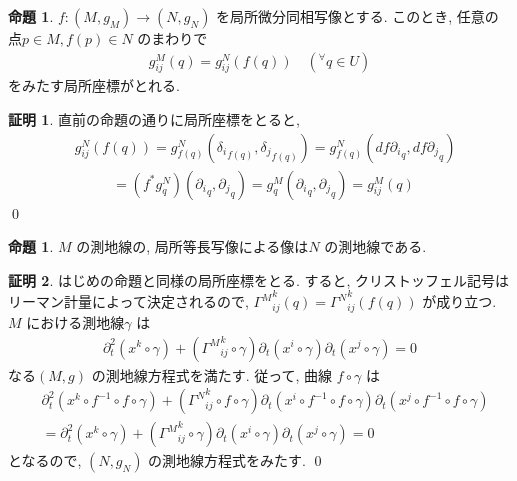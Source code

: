 \documentclass[10pt, fleqn, label-section=none]{bxjsarticle}
\theoremstyle{definition}
\newtheorem{prop}[dfn]{命題}
\newtheorem*{pf*}{証明}
\newcommand{\any}{{}^{\forall}}
\begin{document}
\begin{prop}
$f: (M,g_M) \rightarrow (N,g_N)$ を局所微分同相写像とする. このとき, 任意の点$p \in M, f(p) \in N$ のまわりで  
\begin{align*} g^M_{ij}(q) = g^N_{ij}(f(q)) \quad (\any q \in U) \end{align*}
をみたす局所座標がとれる. 
\end{prop}
\begin{pf*}
直前の命題の通りに局所座標をとると, 
\begin{align*} &g^N_{ij}( f(q) ) = g^N_{f(q)} ({\delta_i}_{f(q)}, { \delta_j}_{f(q)}  ) = g^N_{f(q)} ({df \partial_i}_{q}, {df \partial_j}_{q}  ) \\&\hspace{32pt} = (f^* g^N_q ) ({\partial_i}_q, {\partial_j}_q) =   g^M _q  ({\partial_i}_q, {\partial_j}_q) = g^M _{ij} (q) \end{align*}
\qed
\end{pf*}



\begin{prop}
$M$ の測地線の, 局所等長写像による像は$N$ の測地線である.
\end{prop}
\begin{pf*}
はじめの命題と同様の局所座標をとる. すると, クリストッフェル記号はリーマン計量によって決定されるので, ${\Gamma^ M }_{ij}^k (q) = {\Gamma^N }_{ij}^k (f(q)) $ が成り立つ. $M$ における測地線$\gamma $ は
\begin{align*} \partial_t ^2 (x^k \circ \gamma) + ({\Gamma^M} _{ij}^k \circ \gamma) \partial_t (x^i \circ \gamma) \partial_t (x^j \circ \gamma) = 0\end{align*}
なる$(M,g)$ の測地線方程式を満たす. 従って, 曲線 $f \circ \gamma$ は
\begin{align*}  &\partial_t ^2 (x^k \circ f^{-1} \circ f \circ \gamma) + ({\Gamma^N}_{ij}^k \circ f \circ  \gamma) \partial_t (x^i \circ f^{-1} \circ f \circ\gamma) \partial_t (x^j \circ f^{-1} \circ f \circ \gamma) \\&= \partial_t ^2 (x^k \circ \gamma) + ({\Gamma^M}_{ij}^k  \circ \gamma) \partial_t (x^i \circ \gamma) \partial_t (x^j \circ \gamma) = 0    \end{align*}
となるので, $(N, g_N)$ の測地線方程式をみたす. 
\qed
\end{pf*}
\end{document}
